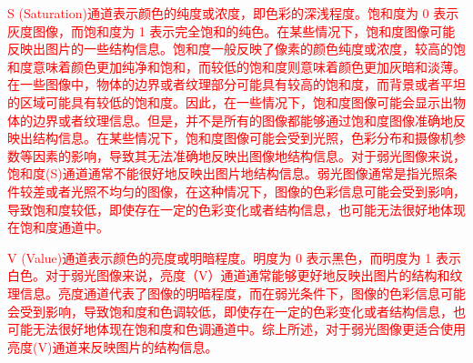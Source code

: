\documentclass[a4paper]{ctexart}
\begin{document}
		\textcolor{red}{S (Saturation)通道表示颜色的纯度或浓度，即色彩的深浅程度。饱和度为 0 表示灰度图像，而饱和度为 1 表示完全饱和的纯色。在某些情况下，饱和度图像可能反映出图片的一些结构信息。饱和度一般反映了像素的颜色纯度或浓度，较高的饱和度意味着颜色更加纯净和饱和，而较低的饱和度则意味着颜色更加灰暗和淡薄。在一些图像中，物体的边界或者纹理部分可能具有较高的饱和度，而背景或者平坦的区域可能具有较低的饱和度。因此，在一些情况下，饱和度图像可能会显示出物体的边界或者纹理信息。但是，并不是所有的图像都能够通过饱和度图像准确地反映出结构信息。在某些情况下，饱和度图像可能会受到光照，色彩分布和摄像机参数等因素的影响，导致其无法准确地反映出图像地结构信息。对于弱光图像来说，饱和度(S)通道通常不能很好地反映出图片地结构信息。弱光图像通常是指光照条件较差或者光照不均匀的图像，在这种情况下，图像的色彩信息可能会受到影响，导致饱和度较低，即使存在一定的色彩变化或者结构信息，也可能无法很好地体现在饱和度通道中。}
					
		\textcolor{red}{V (Value)通道表示颜色的亮度或明暗程度。明度为 0 表示黑色，而明度为 1 表示白色。对于弱光图像来说，亮度（V）通道通常能够更好地反映出图片的结构和纹理信息。亮度通道代表了图像的明暗程度，而在弱光条件下，图像的色彩信息可能会受到影响，导致饱和度和色调较低，即使存在一定的色彩变化或者结构信息，也可能无法很好地体现在饱和度和色调通道中。综上所述，对于弱光图像更适合使用亮度(V)通道来反映图片的结构信息。}
		
\end{document}
